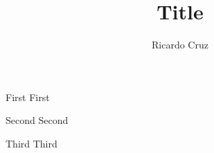 \documentclass{beamer}
\title{Title}
\author{Ricardo Cruz}
\date{}
\newlength\theight
\newlength\sheight
\begin{document}
\setlength{}

{
\begin{frame}
\titlepage
\end{frame}
}

\begin{frame}{First}
First
\end{frame}

\begin{frame}{Second}
Second
\end{frame}

\begin{frame}{Third}
Third
\end{frame}
\end{document}
